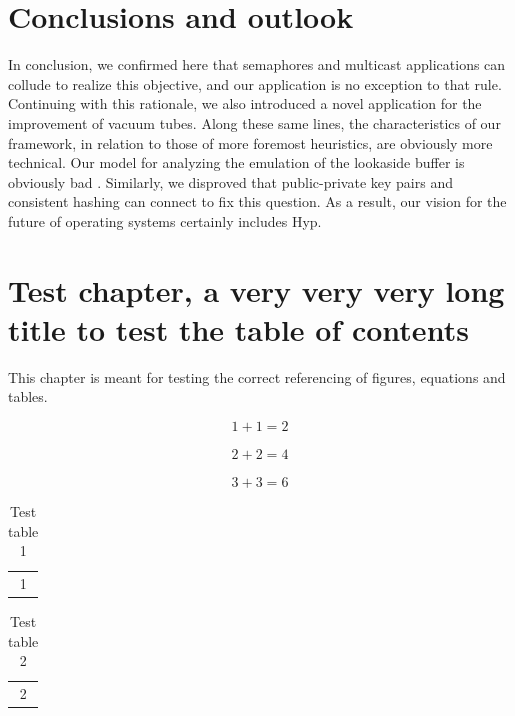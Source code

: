\chapter{Conclusions and outlook}
%
In conclusion, we confirmed here that semaphores and multicast applications can
collude to realize this objective, and our application is no exception to that
rule. Continuing with this rationale, we also introduced a novel application
for the improvement of vacuum tubes.
Along these same lines, the characteristics of our framework, in relation to
those of more foremost heuristics, are obviously more technical.
Our model for analyzing the emulation of the lookaside buffer is obviously bad
\cite{cite:19}.
Similarly, we disproved that public-private key pairs \cite{cite:20, cite:21,
cite:22} and consistent hashing  can connect to fix this question.
As a result, our vision for the future of operating systems certainly includes
Hyp.

\chapter{Test chapter, a very very very long title to test the table of contents}

This chapter is meant for testing the correct referencing of figures, equations
and tables.

%
\begin{equation}
	1 + 1 = 2
	\label{eq:test_eq1}
\end{equation}

\begin{align}
	2 + 2 = 4
	\label{eq:test_eq2}
\end{align}

\begin{equation}
	3 + 3 = 6
	\label{eq:test_eq3_intro}
\end{equation}

%
\begin{table}
	\centering
	\begin{tabular}{c}
		1
	\end{tabular}
	\caption{Test table 1}
	\label{tab:test_tab1}
\end{table}

\begin{table}
	\centering
	\begin{tabular}{c}
		2
	\end{tabular}
	\caption{Test table 2}
	\label{tab:test_tab2}
\end{table}

